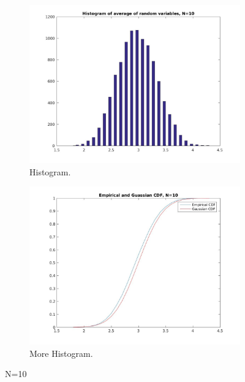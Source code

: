 \documentclass[12pt]{article}
\begin{document}
\begin{figure}[h!]
  \centering
  \begin{subfigure}[b]{0.4\linewidth}
    \includegraphics[width=\linewidth]{jpgs/histograms/10_hist.jpg}
    \caption{Histogram.}
  \end{subfigure}
  \begin{subfigure}[b]{0.4\linewidth}
    \includegraphics[width=\linewidth]{jpgs/cdfs/10_cdf.jpg}
    \caption{More Histogram.}
  \end{subfigure}
  \caption{N=10}
\end{figure}
\end{document}
